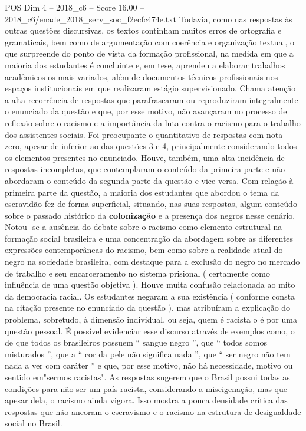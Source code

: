 \begin{textsample}{POS Dim 4 – 2018\_c6 – Score 16.00 – 2018\_c6/enade\_2018\_serv\_soc\_f2ecfc474e.txt}
Todavia, como nas respostas às outras questões discursivas, os textos continham muitos erros de ortografia e gramaticais, bem como de argumentação com coerência e organização textual, o que surpreende do ponto de vista da formação profissional, na medida em que a maioria dos estudantes é concluinte e, em tese, aprendeu a elaborar trabalhos acadêmicos os mais variados, além de documentos técnicos profissionais nos espaços institucionais em que realizaram estágio supervisionado.
Chama atenção a alta recorrência de respostas que parafrasearam ou reproduziram integralmente o enunciado da questão e que, por esse motivo, não avançaram no processo de reflexão sobre o racismo e a importância da luta contra o racismo para o trabalho dos assistentes sociais.
Foi preocupante o quantitativo de respostas com nota zero, apesar de inferior ao das questões 3 e 4, principalmente considerando todos os elementos presentes no enunciado.
Houve, também, uma alta incidência de respostas incompletas, que contemplaram o conteúdo da primeira parte e não abordaram o conteúdo da segunda parte da questão e vice-versa.
Com relação à primeira parte da questão, a maioria dos estudantes que abordou o tema da escravidão fez de forma superficial, situando, nas suas respostas, algum conteúdo sobre o passado histórico da \textbf{colonização} e a presença dos negros nesse cenário.
Notou -se a ausência do debate sobre o racismo como elemento estrutural na formação social brasileira e uma concentração da abordagem sobre as diferentes expressões contemporâneas do racismo, bem como sobre a realidade atual do negro na sociedade brasileira, com destaque para a exclusão do negro no mercado de trabalho e seu encarceramento no sistema prisional ( certamente como influência de uma questão objetiva ).
Houve muita confusão relacionada ao mito da democracia racial.
Os estudantes negaram a sua existência ( conforme consta na citação presente no enunciado da questão ), mas atribuíram a explicação do problema, sobretudo, à dimensão individual, ou seja, quem é racista o é por uma questão pessoal.
É possível evidenciar esse discurso através de exemplos como, o de que todos os brasileiros possuem “ sangue negro ”, que “ todos somos misturados ”, que a “ cor da pele não significa nada ”, que “ ser negro não tem nada a ver com caráter ” e que, por esse motivo, não há necessidade, motivo ou sentido em"sermos racistas".
As respostas sugerem que o Brasil possui todas as condições para não ser um país racista, considerando a miscigenação, mas que apesar dela, o racismo ainda vigora.
Isso mostra a pouca densidade crítica das respostas que não ancoram o escravismo e o racismo na estrutura de desigualdade social no Brasil.

\end{textsample}
